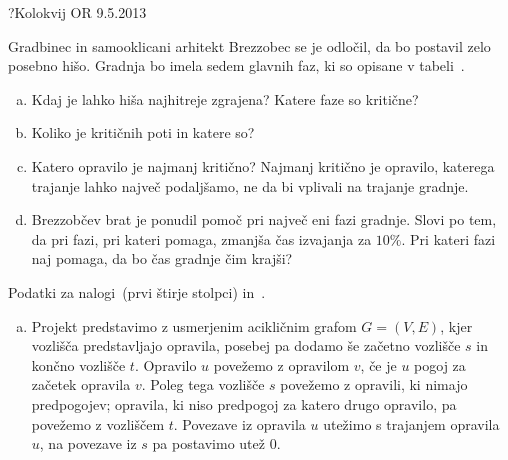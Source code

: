 \begin{naloga}{?}{Kolokvij OR 9.5.2013}
\begin{vprasanje}
Gradbinec in samooklicani arhitekt Brezzobec se je odločil,
da bo postavil zelo posebno hišo.
Gradnja bo imela sedem glavnih faz,
ki so opisane v tabeli~\tab.
\begin{enumerate}[(a)]
\item Kdaj je lahko hiša najhitreje zgrajena?
Katere faze so kritične?
\item Koliko je kritičnih poti in katere so?
\item Katero opravilo je najmanj kritično?
Najmanj kritično je opravilo, katerega trajanje lahko največ podaljšamo,
ne da bi vplivali na trajanje gradnje.
\item Brezzobčev brat je ponudil pomoč pri največ eni fazi gradnje.
Slovi po tem, da pri fazi, pri kateri pomaga, zmanjša čas izvajanja za $10\%$.
Pri kateri fazi naj pomaga, da bo čas gradnje čim krajši?
\end{enumerate}

\begin{tabela}
\caption{Podatki za nalogi~\nal (prvi štirje stolpci)
in~\nal[brezzobec-lp].}
\end{tabela}
\end{vprasanje}

\begin{odgovor}
\begin{enumerate}[(a)]
\item Projekt predstavimo z usmerjenim acikličnim grafom $G = (V, E)$,
kjer vozlišča predstavljajo opravila,
posebej pa dodamo še začetno vozlišče $s$ in končno vozlišče $t$.
Opravilo $u$ povežemo z opravilom $v$,
če je $u$ pogoj za začetek opravila $v$.
Poleg tega vozlišče $s$ povežemo z opravili, ki nimajo predpogojev;
opravila, ki niso predpogoj za katero drugo opravilo,
pa povežemo z vozliščem $t$.
Povezave iz opravila $u$ utežimo s trajanjem opravila $u$,
na povezave iz $s$ pa postavimo utež $0$.


\end{enumerate}
\end{odgovor}
\end{naloga}
